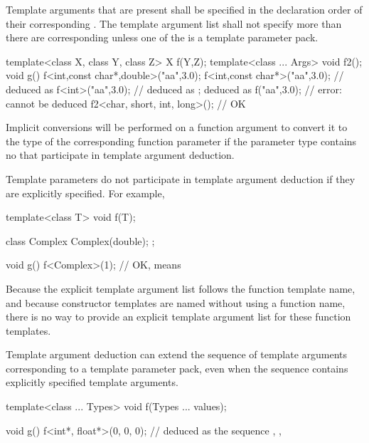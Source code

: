 \pnum
Template arguments that are present shall be specified in the declaration
order of their corresponding
.
The template argument list shall not specify more
than there are corresponding
unless one of the  is a template
parameter pack.
\begin{example}

\begin{codeblock}
template<class X, class Y, class Z> X f(Y,Z);
template<class ... Args> void f2();
void g() {
  f<int,const char*,double>("aa",3.0);
  f<int,const char*>("aa",3.0); //  deduced as 
  f<int>("aa",3.0);             //  deduced as ;  deduced as 
  f("aa",3.0);                  // error:  cannot be deduced
  f2<char, short, int, long>(); // OK
}
\end{codeblock}
\end{example}

\pnum
Implicit conversions will be performed on a function argument
to convert it to the type of the corresponding function parameter if
the parameter type contains no
that participate in template argument deduction.
\begin{note}
Template parameters do not participate in template argument deduction if
they are explicitly specified.
For example,

\begin{codeblock}
template<class T> void f(T);

class Complex {
  Complex(double);
};

void g() {
  f<Complex>(1);    // OK, means 
}
\end{codeblock}
\end{note}

\pnum
\begin{note}
Because the explicit template argument list follows the function
template name, and because
constructor templates are named without using a
function name, there is no way to provide an explicit
template argument list for these function templates.
\end{note}

\pnum
Template argument deduction can extend the sequence of template
arguments corresponding to a template parameter pack, even when the
sequence contains explicitly specified template arguments.
\begin{example}
\begin{codeblock}
template<class ... Types> void f(Types ... values);

void g() {
  f<int*, float*>(0, 0, 0);     //  deduced as the sequence , , 
}
\end{codeblock}
\end{example}


